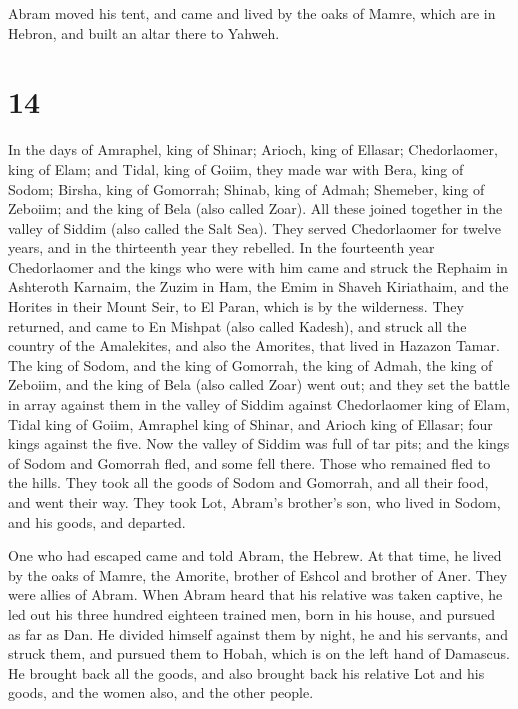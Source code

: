  Abram moved his tent, and came and lived by the oaks of
Mamre, which are in Hebron, and built an altar there to Yahweh.

\hypertarget{section-13}{%
\section{14}\label{section-13}}

 In the days of Amraphel, king of Shinar; Arioch, king of
Ellasar; Chedorlaomer, king of Elam; and Tidal, king of Goiim,
 they made war with Bera, king of Sodom; Birsha, king of
Gomorrah; Shinab, king of Admah; Shemeber, king of Zeboiim; and the king
of Bela (also called Zoar).  All these joined together in
the valley of Siddim (also called the Salt Sea).  They
served Chedorlaomer for twelve years, and in the thirteenth year they
rebelled.  In the fourteenth year Chedorlaomer and the
kings who were with him came and struck the Rephaim in Ashteroth
Karnaim, the Zuzim in Ham, the Emim in Shaveh Kiriathaim, 
and the Horites in their Mount Seir, to El Paran, which is by the
wilderness.  They returned, and came to En Mishpat (also
called Kadesh), and struck all the country of the Amalekites, and also
the Amorites, that lived in Hazazon Tamar.  The king of
Sodom, and the king of Gomorrah, the king of Admah, the king of Zeboiim,
and the king of Bela (also called Zoar) went out; and they set the
battle in array against them in the valley of Siddim 
against Chedorlaomer king of Elam, Tidal king of Goiim, Amraphel king of
Shinar, and Arioch king of Ellasar; four kings against the five.
 Now the valley of Siddim was full of tar pits; and the
kings of Sodom and Gomorrah fled, and some fell there. Those who
remained fled to the hills.  They took all the goods of
Sodom and Gomorrah, and all their food, and went their way.
 They took Lot, Abram's brother's son, who lived in
Sodom, and his goods, and departed.

 One who had escaped came and told Abram, the Hebrew. At
that time, he lived by the oaks of Mamre, the Amorite, brother of Eshcol
and brother of Aner. They were allies of Abram.  When
Abram heard that his relative was taken captive, he led out his three
hundred eighteen trained men, born in his house, and pursued as far as
Dan.  He divided himself against them by night, he and
his servants, and struck them, and pursued them to Hobah, which is on
the left hand of Damascus.  He brought back all the
goods, and also brought back his relative Lot and his goods, and the
women also, and the other people.

